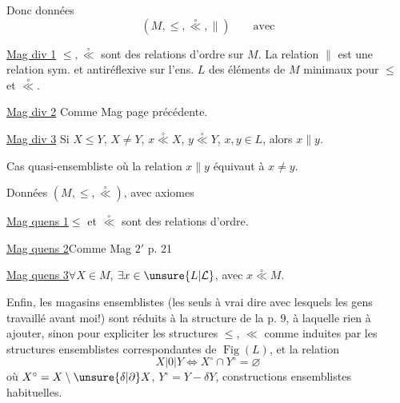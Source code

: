 Donc données
\[
(M,\leq,\overset{\circ}{\ll},\parallel)\qquad\text{avec}
\]

\uline{Mag div 1} $\leq,\overset{\circ}{\ll}$ sont des relations d'ordre sur $M$. La relation $\parallel$ est une relation sym. et antiréflexive sur l'ens. $L$ des éléments de $M$ minimaux pour $\leq$ et $\overset{\circ}{\ll}$.

\uline{Mag div 2} Comme Mag  page précédente.

\uline{Mag div 3} Si $X\leq Y$, $X\neq Y$, $x\overset{\circ}{\ll}X$, $y\overset{\circ}{\ll}Y$, $x,y\in L$, alors $x\parallel y$. 


Cas quasi-ensembliste où la relation $x\parallel y$ équivaut à $x\ne y$.

Données $(M,\leq,\overset{\circ}{\ll})$, avec axiomes

\uline{Mag quens 1}\quad $\leq$ et $\overset{\circ}{\ll}$ sont des relations d'ordre.

\uline{Mag quens 2}\quad Comme Mag $2'$ p. 21

\uline{Mag quens 3}\quad $\forall X\in M$, $\exists x\in\unsure{L|\mathcal L}$, avec $x\overset{\circ}{\ll}M$.


Enfin, les magasins ensemblistes (les seuls à vrai dire avec lesquels les gens  travaillé avant moi!) sont réduits à la structure de la p. 9, à laquelle  rien à ajouter, sinon pour expliciter les structures $\leq$, $\ll$ comme induites par les structures ensemblistes correspondantes de $\operatorname{Fig}(L)$, et la  relation
\[
X|0|Y\Longleftrightarrow X^\circ\cap Y^\circ=\varnothing
\]
où $X^\circ=X\setminus\unsure{\delta|\partial}X$, $Y^\circ=Y-\delta Y$, constructions ensemblistes habituelles.

